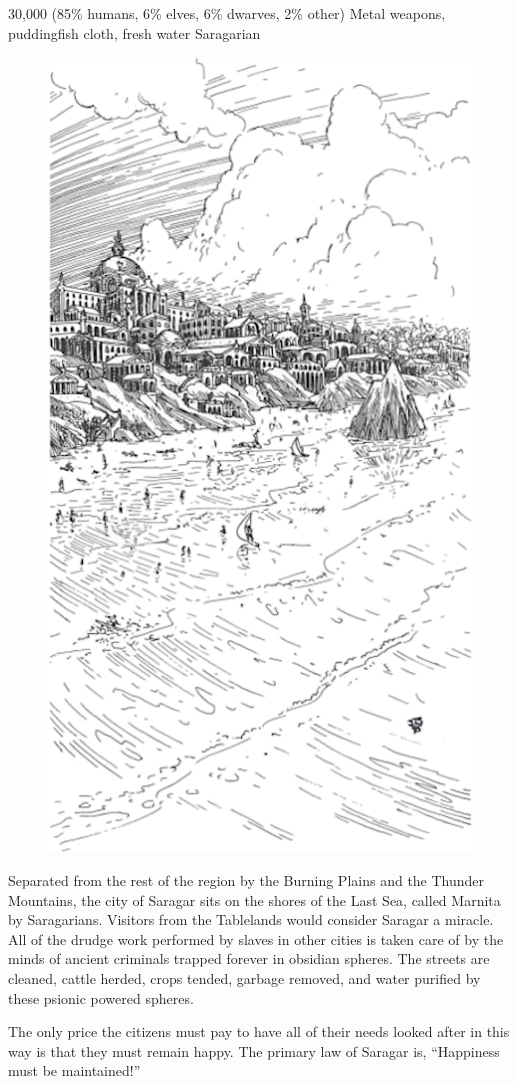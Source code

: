 {30,000 (85\% humans, 6\% elves, 6\% dwarves, 2\% other)}
{Metal weapons, puddingfish cloth, fresh water}
{Saragarian}
{
\begin{figure}[b!]
\centering
\includegraphics[width=\columnwidth]{images/saragar-2.png}
\WOTC
\end{figure}

	Separated from the rest of the region by the Burning Plains and the Thunder Mountains, the city of Saragar sits on the shores of the Last Sea, called Marnita by Saragarians. Visitors from the Tablelands would consider Saragar a miracle. All of the drudge work performed by slaves in other cities is taken care of by the minds of ancient criminals trapped forever in obsidian spheres. The streets are cleaned, cattle herded, crops tended, garbage removed, and water purified by these psionic powered spheres.

	The only price the citizens must pay to have all of their needs looked after in this way is that they must remain happy. The primary law of Saragar is, ``Happiness must be maintained!''
}
